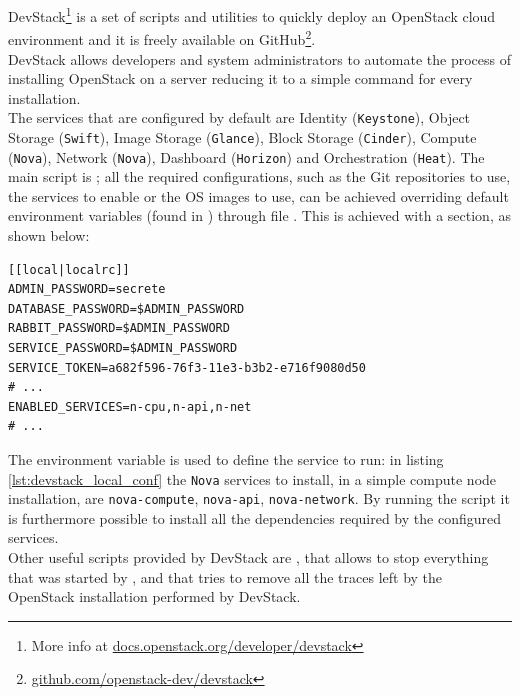 DevStack\footnote{More info at \url{docs.openstack.org/developer/devstack}} is a set of scripts and utilities to quickly deploy an OpenStack cloud environment and it is freely available on GitHub\footnote{\url{github.com/openstack-dev/devstack}}.\\
DevStack allows developers and system administrators to automate the process of installing OpenStack on a server reducing it to a simple command for every installation.\\
The services that are configured by default are Identity (\texttt{Keystone}), Object Storage (\texttt{Swift}), Image Storage (\texttt{Glance}), Block Storage (\texttt{Cinder}), Compute (\texttt{Nova}), Network (\texttt{Nova}), Dashboard (\texttt{Horizon}) and Orchestration (\texttt{Heat}).
The main script is ; all the required configurations, such as the Git repositories to use, the services to enable or the OS images to use, can be achieved overriding default environment variables (found in ) through file . This is achieved with a  section, as shown below:
\begin{lstlisting}[numbers=none,label={lst:devstack_local_conf}]
[[local|localrc]]
ADMIN_PASSWORD=secrete
DATABASE_PASSWORD=$ADMIN_PASSWORD
RABBIT_PASSWORD=$ADMIN_PASSWORD
SERVICE_PASSWORD=$ADMIN_PASSWORD
SERVICE_TOKEN=a682f596-76f3-11e3-b3b2-e716f9080d50
# ...
ENABLED_SERVICES=n-cpu,n-api,n-net
# ...
\end{lstlisting}
The environment variable  is used to define the service to run: in listing \ref{lst:devstack_local_conf} the \texttt{Nova} services to install, in a simple compute node installation, are \texttt{nova-compute}, \texttt{nova-api}, \texttt{nova-network}.
By running the script  it is furthermore possible to install all the dependencies required by the configured services.\\Other useful scripts provided by DevStack are , that allows to stop everything that was started by , and  that tries to remove all the traces left by the OpenStack installation performed by DevStack.
